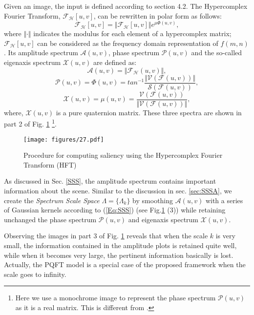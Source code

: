 \documentclass[10pt,journal,cspaper,compsoc]{IEEEtran}
\begin{document}
Given an image, the input is defined according to section 4.2. The Hypercomplex Fourier Transform, $\mathcal {F_{H}}[u,v]$, can be rewritten in polar form as follows:
\begin{equation}
\mathcal {F_{H}}[u,v]=\Vert\mathcal {F_{H}}[u,v]\Vert e^{\mu \Phi (u,v)},
\label{Eq:qft6}
\end{equation}
where $\Vert\cdot \Vert$ indicates the modulus for each element of a hypercomplex matrix;
$\mathcal {F_{H}}[u,v]$ can be considered as the frequency domain representation of $f(m,n)$.  Its amplitude spectrum $\mathcal{A}(u,v)$, phase spectrum $\mathcal{P}(u,v)$ and the so-called eigenaxis spectrum $\mathcal{X}(u,v)$ are defined as:
$$\mathcal{A}(u,v)=\Vert\mathcal{F_{H}}(u,v)\Vert,$$
$$\mathcal{P}(u,v)={\Phi}{(u,v)}=tan^{-1}\frac{\Vert\mathcal{V}{(\mathcal{F}(u,v))}\Vert}{\mathcal{S}{(\mathcal{F}(u,v))}},$$
$$\mathcal{X}(u,v)=\mu (u,v)=\frac{\mathcal{V}({\mathcal{F}(u,v)})}{\Vert \mathcal{V}({\mathcal{F}(u,v)})\Vert},$$
where, $\mathcal{X}(u,v)$ is a pure quaternion matrix. These three spectra are shown in part 2 of Fig. \ref{fig:pHFT} \footnote{Here we use a monochrome image to represent the phase spectrum $\mathcal{P}(u,v)$ as it is a real matrix. This is different from  \cite{ell2006hypercomplex}.}.
\begin{figure}
\begin{center}
\texttt{[image: figures/27.pdf]}
\end{center}
   \caption{Procedure for computing  saliency  using the Hypercomplex Fourier Transform (HFT)}
\label{fig:pHFT}
\end{figure}

As discussed in Sec. \ref{SSS}, the amplitude spectrum contains important information about the scene. Similar to the discussion in sec. \ref{sec:SSSA}, we create the {\it Spectrum Scale Space} $\Lambda=\{\Lambda_{k}\}$ by smoothing $\mathcal{A}(u,v)$ with a series of Gaussian kernels according to (\ref{Eq:SSS}) (see Fig.\ref{fig:pHFT} (3)) while retaining unchanged the phase spectrum $\mathcal{P}(u,v)$ and eigenaxis spectrum $\mathcal{X}(u,v)$.

Observing the images in part 3 of Fig. \ref{fig:pHFT} reveals that when the scale $k$ is very small, the information contained in the amplitude plots is retained quite well, while when it becomes very large, the pertinent information basically is lost. Actually, the PQFT model is a special case of the proposed framework when the scale goes to infinity.
\end{document}
